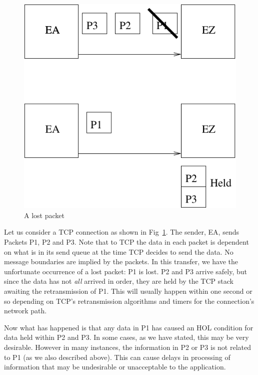 \documentclass[conference]{IEEEtran}
\begin{document}
\begin{figure}
\includegraphics{lostpacket}
\caption{A lost packet}
\label{lost}
\end{figure}

Let us consider a TCP connection as shown in Fig~\ref{lost}. 
The sender, EA, sends Packets P1, P2 and P3. Note that to TCP the data
in each packet is dependent on what is in its send queue at the time TCP decides
to send the data.  No message boundaries are implied by the packets. In this
transfer, we have the unfortunate occurrence of a lost packet: P1 is lost. P2 and P3
arrive safely, but since the data has not \emph{all} arrived in order, they are held by the TCP stack
awaiting the retransmission of P1. This will usually happen within one second or so
depending on TCP's retransmission algorithms and timers for the connection's network path.

Now what has happened is that any data in P1 has caused an HOL condition for data
held within P2 and P3. In some cases, as we have stated, this may be very desirable.
However in many instances, the information in P2 or P3 is not related to P1 (as we also
described above). This can cause delays in processing of information that may
be undesirable or unacceptable to the application.
\end{document}
